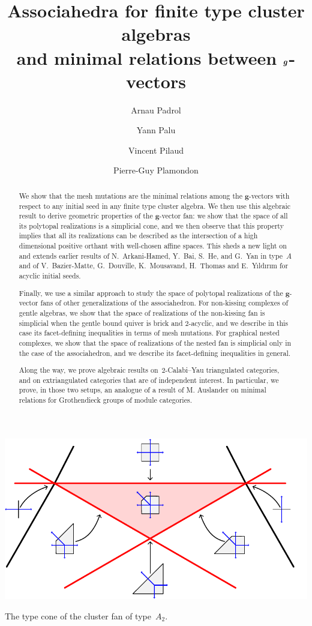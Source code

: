 \documentclass{amsart}
\title[Generalized associahedra and minimal relations between $\b{g}$-vectors]{Associahedra for finite type cluster algebras \\ and minimal relations between $\b{g}$-vectors}
\author{Arnau Padrol}
\author{Yann Palu}
\author{Vincent Pilaud}
\author{Pierre-Guy Plamondon}
\theoremstyle{definition}
\renewcommand{\b}[1]{{\boldsymbol{#1}}} %
\begin{document}
\begin{abstract}
We show that the mesh mutations are the minimal relations among the $\b{g}$-vectors with respect to any initial seed in any finite type cluster algebra.
We then use this algebraic result to derive geometric properties of the $\b{g}$-vector fan: we show that the space of all its polytopal realizations is a simplicial cone, and we then observe that this property implies that all its realizations can be described as the intersection of a high dimensional positive orthant with well-chosen affine spaces.
This sheds a new light on and extends earlier results of N.~Arkani-Hamed, Y.~Bai, S.~He, and G.~Yan in type~$A$ and of V.~Bazier-Matte, G.~Douville, K.~Mousavand, H.~Thomas and E.~Y\i ld\i r\i m for acyclic initial seeds.

Finally, we use a similar approach to study the space of polytopal realizations of the $\b{g}$-vector fans of other generalizations of the associahedron.
For non-kissing complexes of gentle algebras, we show that the space of realizations of the non-kissing fan is simplicial when the gentle bound quiver is brick and $2$-acyclic, and we describe in this case its facet-defining inequalities in terms of mesh mutations.
For graphical nested complexes, we show that the space of realizations of the nested fan is simplicial only in the case of the associahedron, and we describe its facet-defining inequalities in general.

Along the way, we prove algebraic results on~$2$-Calabi--Yau triangulated categories, and on extriangulated categories that are of independent interest.
In particular, we prove, in those two setups, an analogue of a result of M. Auslander on minimal relations for Grothendieck groups of module categories.
\end{abstract}

\maketitle

\vspace{2cm}
\centerline{\includegraphics[scale=.8]{typeConeCoarsenings}}
\vspace{.5cm}
\centerline{The type cone of the cluster fan of type~$A_2$.}
\end{document}
